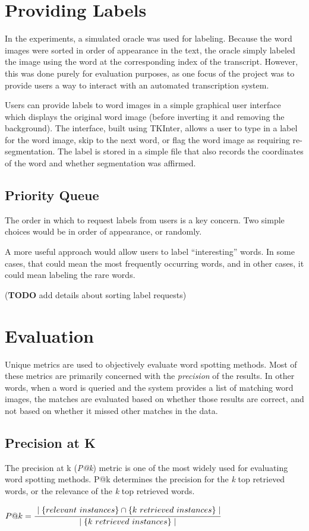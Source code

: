 \documentclass[final]{ukthesis}
\begin{document}
%
%
\section{Providing Labels}
In the experiments, a simulated oracle was used for labeling. Because the word images were sorted in order of appearance in the text, the oracle simply labeled the image using the word at the corresponding index of the transcript. However, this was done purely for evaluation purposes, as one focus of the project was to provide users a way to interact with an automated transcription system.

Users can provide labels to word images in a simple graphical user interface which displays the original word image (before inverting it and removing the background). The interface, built using TKInter, allows a user to type in a label for the word image, skip to the next word, or flag the word image as requiring re-segmentation. The label is stored in a simple file that also records the coordinates of the word and whether segmentation was affirmed.

\subsection{Priority Queue}
The order in which to request labels from users is a key concern. Two simple choices would be in order of appearance, or randomly.

A more useful approach would allow users to label ``interesting'' words. In some cases, that could mean the most frequently occurring words, and in other cases, it could mean labeling the rare words.

(\textbf{TODO} add details about sorting label requests)


%
%
\section{Evaluation}
Unique metrics are used to objectively evaluate word spotting methods. Most of these metrics are primarily concerned with the {\em precision} of the results. In other words, when a word is queried and the system provides a list of matching word images, the matches are evaluated based on whether those results are correct, and not based on whether it missed other matches in the data.

\subsection{Precision at K}
The precision at k ({\em P@k}) metric is one of the most widely used for evaluating word spotting methods. P@k determines the precision for the {\em k} top retrieved words, or the relevance of the {\em k} top retrieved words.
\begin{center}
\begin{math}
{P@k}=\cfrac{\mid\{relevant\ instances\}\cap\{k\ retrieved\ instances\}\mid} {\mid \{k\ retrieved\ instances\}\mid}
\end{math}
\end{center}
\end{document}
